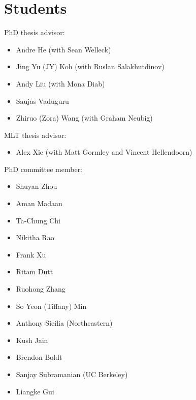 


\section{Students}
PhD thesis advisor:
\begin{itemize}
  \item Andre He (with Sean Welleck)
  \item Jing Yu (JY) Koh (with Ruslan Salakhutdinov)
  \item Andy Liu (with Mona Diab)
  \item Saujas Vaduguru
  \item Zhiruo (Zora) Wang (with Graham Neubig)
\end{itemize}
MLT thesis advisor:
\begin{itemize}
  \item Alex Xie (with Matt Gormley and Vincent Hellendoorn)
\end{itemize}
PhD committee member:
\begin{itemize}
  \item Shuyan Zhou
  \item Aman Madaan
  \item Ta-Chung Chi
  \item Nikitha Rao
  \item Frank Xu
  \item Ritam Dutt
  \item Ruohong Zhang
  \item So Yeon (Tiffany) Min
  \item Anthony Sicilia (Northeastern)
  \item Kush Jain
  \item Brendon Boldt
  \item Sanjay Subramanian (UC Berkeley)
  \item Liangke Gui
\end{itemize}


